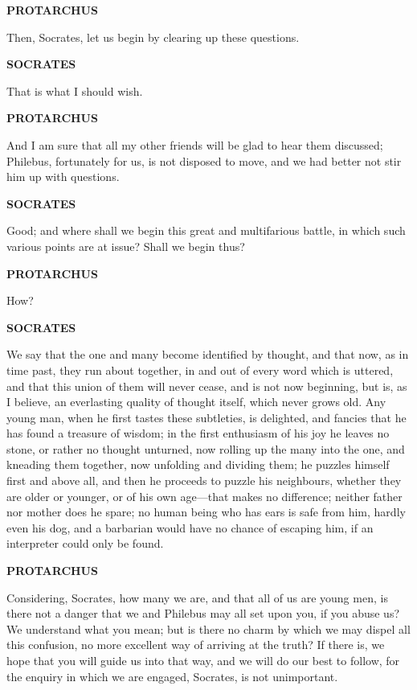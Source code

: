\documentclass[11pt,letter]{article}
\begin{document}
\par \textbf{PROTARCHUS}
\par   Then, Socrates, let us begin by clearing up these questions.

\par \textbf{SOCRATES}
\par   That is what I should wish.

\par \textbf{PROTARCHUS}
\par   And I am sure that all my other friends will be glad to hear them discussed; Philebus, fortunately for us, is not disposed to move, and we had better not stir him up with questions.

\par \textbf{SOCRATES}
\par   Good; and where shall we begin this great and multifarious battle, in which such various points are at issue? Shall we begin thus?

\par \textbf{PROTARCHUS}
\par   How?

\par \textbf{SOCRATES}
\par   We say that the one and many become identified by thought, and that now, as in time past, they run about together, in and out of every word which is uttered, and that this union of them will never cease, and is not now beginning, but is, as I believe, an everlasting quality of thought itself, which never grows old. Any young man, when he first tastes these subtleties, is delighted, and fancies that he has found a treasure of wisdom; in the first enthusiasm of his joy he leaves no stone, or rather no thought unturned, now rolling up the many into the one, and kneading them together, now unfolding and dividing them; he puzzles himself first and above all, and then he proceeds to puzzle his neighbours, whether they are older or younger, or of his own age—that makes no difference; neither father nor mother does he spare; no human being who has ears is safe from him, hardly even his dog, and a barbarian would have no chance of escaping him, if an interpreter could only be found.

\par \textbf{PROTARCHUS}
\par   Considering, Socrates, how many we are, and that all of us are young men, is there not a danger that we and Philebus may all set upon you, if you abuse us? We understand what you mean; but is there no charm by which we may dispel all this confusion, no more excellent way of arriving at the truth? If there is, we hope that you will guide us into that way, and we will do our best to follow, for the enquiry in which we are engaged, Socrates, is not unimportant.
\end{document}
